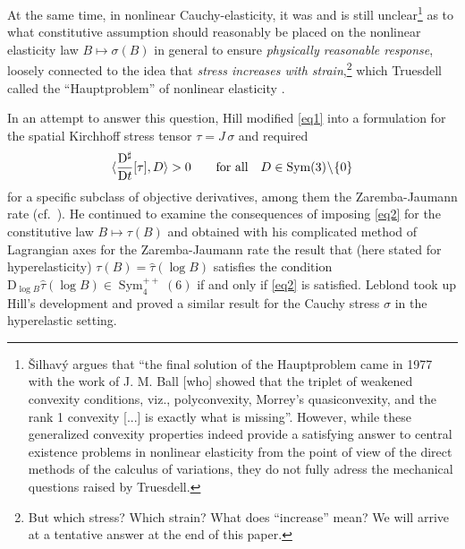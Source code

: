 \documentclass[10pt]{article}
\numberwithin{theoremCounter}{section}
\theoremstyle{plain}
\theoremstyle{definition}
\newcommand{\DD}{\mathrm{D}}
\DeclareMathOperator{\Sym}{Sym}
\numberwithin{equation}{section}
\begin{document}
At the same time, in nonlinear Cauchy-elasticity, it was and is still unclear\footnote
{%
{\v{S}}ilhav{\'y} \cite{Silhavy2019}
argues that \enquote{the final solution of the Hauptproblem came in 1977 with the work of J. M. Ball [who] showed that the triplet of weakened convexity conditions, viz., polyconvexity, Morrey’s quasiconvexity, and the rank 1 convexity [...] is exactly what is missing}.
However, while these generalized convexity properties indeed provide a satisfying answer to central existence problems in nonlinear elasticity from the point of view of the direct methods of the calculus of variations, they do not fully adress the mechanical questions raised by Truesdell.
}
as to what constitutive assumption should reasonably be placed on the nonlinear elasticity law $B \mapsto \sigma(B)$ in general to ensure \emph{physically reasonable response}, loosely connected to the idea that \emph{stress increases with strain},\footnote
{
But which stress? Which strain? What does \enquote{increase} mean? We will arrive at a tentative answer at the end of this paper.
}
which Truesdell called the \enquote{Hauptproblem} of nonlinear elasticity \cite{truesdell1956ungeloste}.

In an attempt to answer this question, Hill modified \eqref{eq1} into a formulation for the spatial Kirchhoff stress tensor $\tau = J \, \sigma$ and required
	\begin{align}\label{eq2}
	\langle \frac{\DD^{\sharp}}{\DD t}[\tau] ,D\rangle>0 \qquad \textnormal{for all}\quad D \in \Sym(3) \! \setminus \! \{0\}
	\end{align}
for a specific subclass of objective derivatives, among them the Zaremba-Jaumann rate (cf.~\cite{jaumann1905, jaumann1911geschlossenes, zaremba1903forme}). He continued to examine the consequences of imposing \eqref{eq2} for the constitutive law $B\mapsto \tau(B)$ and obtained with his complicated method of Lagrangian axes for the Zaremba-Jaumann rate the result that (here stated for hyperelasticity) $\tau(B)=\widehat{\tau}(\log B)$ satisfies the condition $\DD_{\log B} \widehat \tau(\log B) \in \Sym^{++}_4(6)$ if and only if \eqref{eq2} is satisfied. Leblond \cite{leblond1992constitutive} took up Hill's development and proved a similar result for the Cauchy stress $\sigma$ in the hyperelastic setting.
\end{document}
